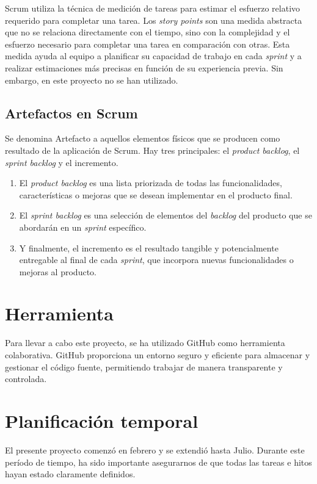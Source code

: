 Scrum utiliza la técnica de medición de tareas para estimar el esfuerzo relativo
requerido para completar una tarea. Los \textit{story points} son una medida abstracta
que no se relaciona directamente con el tiempo, sino con la complejidad y el
esfuerzo necesario para completar una tarea en comparación con otras. Esta medida
ayuda al equipo a planificar su capacidad de trabajo en cada \textit{sprint} y a
realizar estimaciones más precisas en función de su experiencia previa. Sin embargo, en este proyecto no se han utilizado.

\subsection{Artefactos en Scrum}

Se denomina Artefacto a aquellos elementos físicos que se producen como resultado
de la aplicación de Scrum. Hay tres principales: el \textit{product backlog}, el
\textit{sprint backlog} y el incremento.
\begin{enumerate}
	\item El \textit{product backlog} es una lista priorizada de todas las
		funcionalidades, características o mejoras que se desean implementar en el producto
		final.

	\item El \textit{sprint backlog} es una selección de elementos del \textit{backlog}
		del producto que se abordarán en un \textit{sprint} específico.

	\item Y finalmente, el incremento es el resultado tangible y potencialmente
		entregable al final de cada \textit{sprint}, que incorpora nuevas
		funcionalidades o mejoras al producto.
\end{enumerate}

\section{Herramienta}
Para llevar a cabo este proyecto, se ha utilizado GitHub como herramienta colaborativa.
GitHub proporciona un entorno seguro y eficiente para almacenar y gestionar el
código fuente, permitiendo trabajar de manera transparente y controlada.

\section{Planificación temporal}

El presente proyecto comenzó en febrero y se extendió hasta Julio. Durante este
período de tiempo, ha sido importante asegurarnos de que todas las tareas e hitos
hayan estado claramente definidos.


